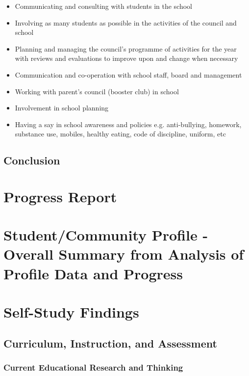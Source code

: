 \documentclass{report}
\begin{document}
\begin{itemize}
\item Communicating and consulting with students in the school
\item Involving as many students as possible in the activities of the council and school
\item Planning and managing the council's programme of activities for the year with reviews and evaluations to improve upon and change when necessary
\item Communication and co-operation with school staff, board and management
\item Working with parent's council (booster club) in school
\item Involvement in school planning
\item Having a say in school awareness and policies e.g. anti-bullying, homework, substance use, mobiles, healthy eating, code of discipline, uniform, etc
\end{itemize}

\section{Conclusion}

\chapter{Progress Report}
\chapter[Student/Community Profile Summary]{Student/Community Profile - Overall Summary from Analysis of Profile Data and Progress}
\chapter{Self-Study Findings}
\section{Curriculum, Instruction, and Assessment}
\subsection{Current Educational Research and Thinking}
\end{document}

